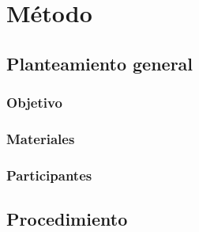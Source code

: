 
\chapter{Método} %

\label{Cap_Exp} %

\section{Planteamiento general}

\subsection{Objetivo}

\subsection{Materiales}


\subsection{Participantes}


\section{Procedimiento}

